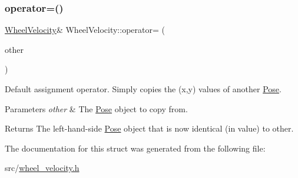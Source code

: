 \subsubsection{\texorpdfstring{operator=()}{operator=()}}
{\footnotesize\ttfamily \mbox{\hyperlink{struct_wheel_velocity}{Wheel\+Velocity}}\& Wheel\+Velocity\+::operator= (\begin{DoxyParamCaption}\item[{const \mbox{\hyperlink{struct_wheel_velocity}{Wheel\+Velocity}} \&}]{other }\end{DoxyParamCaption})\hspace{0.3cm}{\ttfamily [default]}}



Default assignment operator. Simply copies the (x,y) values of another \mbox{\hyperlink{struct_pose}{Pose}}. 


\begin{DoxyParams}{Parameters}
{\em other} & The \mbox{\hyperlink{struct_pose}{Pose}} object to copy from.\\
\hline
\end{DoxyParams}
\begin{DoxyReturn}{Returns}
The left-\/hand-\/side \mbox{\hyperlink{struct_pose}{Pose}} object that is now identical (in value) to {\ttfamily other}. 
\end{DoxyReturn}


The documentation for this struct was generated from the following file\+:\begin{DoxyCompactItemize}
\item 
src/\mbox{\hyperlink{wheel__velocity_8h}{wheel\+\_\+velocity.\+h}}\end{DoxyCompactItemize}
